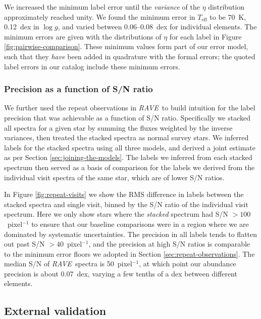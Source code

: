 \documentclass[preprint]{aastex61}
\newcommand{\acronym}[1]{{\small{#1}}}
\newcommand{\project}[1]{\textsl{#1}}
\newcommand{\rave}{\project{\acronym{RAVE}}}
\newcommand{\teff}{T_{\mathrm{eff}}}
\newcommand{\logg}{\log g}
\begin{document}
We increased the minimum label error until the \emph{variance} of the $\eta$ 
distribution approximately reached unity.  We found the minimum error in
$\teff$ to be 70~K, 0.12~dex in $\logg$, and varied between 0.06--0.08~dex
for individual elements.  The minimum errors are given with the 
distributions of $\eta$ for each label in Figure \ref{fig:pairwise-comparison}.
These minimum values form part of our error model, such that they \emph{have} 
been added in quadrature with the formal errors; the quoted label errors 
in our catalog include these minimum errors.


\subsubsection{Precision as a function of S/N ratio}
\label{sec:precision-wrt-snr}


We further used the repeat observations in \rave\ to build intuition for
the label precision that was achievable as a function of S/N ratio.  
Specifically we stacked all spectra for a given star by summing the 
fluxes weighted by the inverse variances, then treated the stacked spectra
as normal survey stars.  We inferred labels for the stacked spectra 
using all three models, and derived a joint estimate as per Section 
\ref{sec:joining-the-models}.  The labels we inferred from each stacked 
spectrum then served as a basis of comparison for the labels we derived 
from the individual visit spectra of the same star, which are of lower 
S/N ratios.


In Figure \ref{fig:repeat-visits} we show the RMS difference
in labels between the stacked spectra and single visit, binned by the
S/N ratio of the individual visit spectrum.  Here we only show stars
where the \emph{stacked} spectrum had S/N $>100$~pixel$^{-1}$ to ensure
that our baseline comparisons were in a region where we are dominated
by systematic uncertainties.  The precision in all labels tends to
flatten out past S/N $> 40$~pixel$^{-1}$, and the precision at high S/N
ratios is comparable to the minimum error floors we adopted in Section
\ref{sec:repeat-observations}.  The median S/N of \rave\ spectra is
50~pixel$^{-1}$, at which point our abundance precision is about 
0.07~dex, varying a few tenths of a dex between different elements.


\subsection{External validation}
\label{sec:external-validation}
\end{document}
